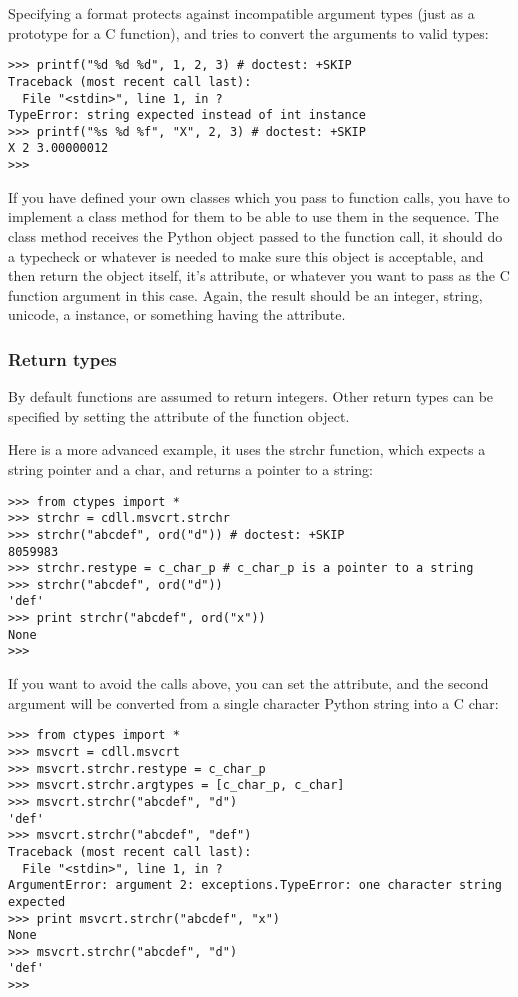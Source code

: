 Specifying a format protects against incompatible argument types (just
as a prototype for a C function), and tries to convert the arguments
to valid types:
\begin{verbatim}
>>> printf("%d %d %d", 1, 2, 3) # doctest: +SKIP
Traceback (most recent call last):
  File "<stdin>", line 1, in ?
TypeError: string expected instead of int instance
>>> printf("%s %d %f", "X", 2, 3) # doctest: +SKIP
X 2 3.00000012
>>>
\end{verbatim}

If you have defined your own classes which you pass to function calls,
you have to implement a  class method for them to be
able to use them in the  sequence. The 
class method receives the Python object passed to the function call,
it should do a typecheck or whatever is needed to make sure this
object is acceptable, and then return the object itself, it's
 attribute, or whatever you want to pass as the C
function argument in this case. Again, the result should be an
integer, string, unicode, a  instance, or something having
the  attribute.


\subsubsection{Return types\label{ctypes-return-types}}

By default functions are assumed to return integers.  Other return
types can be specified by setting the  attribute of the
function object.

Here is a more advanced example, it uses the strchr function, which
expects a string pointer and a char, and returns a pointer to a
string:
\begin{verbatim}
>>> from ctypes import *
>>> strchr = cdll.msvcrt.strchr
>>> strchr("abcdef", ord("d")) # doctest: +SKIP
8059983
>>> strchr.restype = c_char_p # c_char_p is a pointer to a string
>>> strchr("abcdef", ord("d"))
'def'
>>> print strchr("abcdef", ord("x"))
None
>>>
\end{verbatim}

If you want to avoid the  calls above, you can set the
 attribute, and the second argument will be converted from
a single character Python string into a C char:
\begin{verbatim}
>>> from ctypes import *
>>> msvcrt = cdll.msvcrt
>>> msvcrt.strchr.restype = c_char_p
>>> msvcrt.strchr.argtypes = [c_char_p, c_char]
>>> msvcrt.strchr("abcdef", "d")
'def'
>>> msvcrt.strchr("abcdef", "def")
Traceback (most recent call last):
  File "<stdin>", line 1, in ?
ArgumentError: argument 2: exceptions.TypeError: one character string expected
>>> print msvcrt.strchr("abcdef", "x")
None
>>> msvcrt.strchr("abcdef", "d")
'def'
>>>
\end{verbatim}

